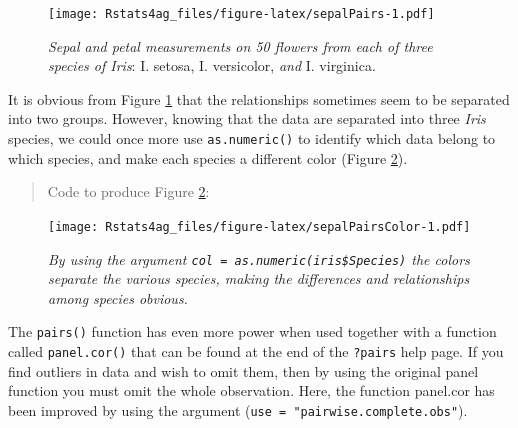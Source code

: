 \documentclass[letterpaper,]{book}
\newenvironment{Shaded}{\begin{snugshade}}{\end{snugshade}}
\newcommand{\DataTypeTok}[1]{\textcolor[rgb]{0.13,0.29,0.53}{#1}}
\newcommand{\KeywordTok}[1]{\textcolor[rgb]{0.13,0.29,0.53}{\textbf{#1}}}
\newcommand{\NormalTok}[1]{#1}
\newcommand{\OperatorTok}[1]{\textcolor[rgb]{0.81,0.36,0.00}{\textbf{#1}}}
\newcommand{\StringTok}[1]{\textcolor[rgb]{0.31,0.60,0.02}{#1}}
\begin{document}
\begin{figure}
\centering
\texttt{[image: Rstats4ag\_files/figure-latex/sepalPairs-1.pdf]}
\caption{\label{fig:sepalPairs}\emph{Sepal and petal measurements on 50 flowers from each of three species of Iris}: I. setosa, I. versicolor, \emph{and} I. virginica.}
\end{figure}

It is obvious from Figure \ref{fig:sepalPairs} that the relationships sometimes seem to be separated into two groups. However, knowing that the data are separated into three \emph{Iris} species, we could once more use \texttt{as.numeric()} to identify which data belong to which species, and make each species a different color (Figure \ref{fig:sepalPairsColor}).

\begin{quote}
Code to produce Figure \ref{fig:sepalPairsColor}:
\end{quote}

\begin{Shaded}
\end{Shaded}

\begin{figure}
\centering
\texttt{[image: Rstats4ag\_files/figure-latex/sepalPairsColor-1.pdf]}
\caption{\label{fig:sepalPairsColor}\emph{By using the argument \texttt{col\ =\ as.numeric(iris\$Species)} the colors separate the various species, making the differences and relationships among species obvious.}}
\end{figure}

The \texttt{pairs()} function has even more power when used together with a function called \texttt{panel.cor()} that can be found at the end of the \texttt{?pairs} help page. If you find outliers in data and wish to omit them, then by using the original panel function you must omit the whole observation. Here, the function panel.cor has been improved by using the argument (\texttt{use\ =\ "pairwise.complete.obs"}).
\end{document}
